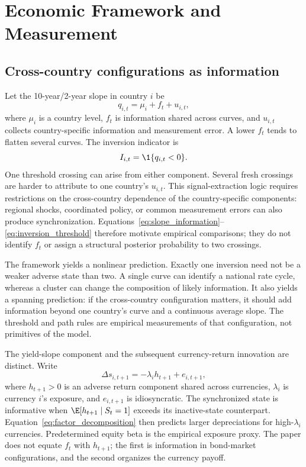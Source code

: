 \section{Economic Framework and Measurement}
\label{sec:setting}

\subsection{Cross-country configurations as information}

Let the 10-year/2-year slope in country $i$ be
\begin{equation}
    q_{i,t}=\mu_i+f_t+u_{i,t},
    \label{eq:slope_information}
\end{equation}
where $\mu_i$ is a country level, $f_t$ is information shared across curves, and $u_{i,t}$ collects country-specific information and measurement error. A lower $f_t$ tends to flatten several curves. The inversion indicator is
\begin{equation}
    I_{i,t}=\1\{q_{i,t}<0\}.
    \label{eq:inversion_threshold}
\end{equation}
One threshold crossing can arise from either component. Several fresh crossings are harder to attribute to one country's $u_{i,t}$. This signal-extraction logic requires restrictions on the cross-country dependence of the country-specific components: regional shocks, coordinated policy, or common measurement errors can also produce synchronization. Equations~\eqref{eq:slope_information}--\eqref{eq:inversion_threshold} therefore motivate empirical comparisons; they do not identify $f_t$ or assign a structural posterior probability to two crossings.

The framework yields a nonlinear prediction. Exactly one inversion need not be a weaker adverse state than two. A single curve can identify a national rate cycle, whereas a cluster can change the composition of likely information. It also yields a spanning prediction: if the cross-country configuration matters, it should add information beyond one country's curve and a continuous average slope. The threshold and path rules are empirical measurements of that configuration, not primitives of the model.

The yield-slope component and the subsequent currency-return innovation are distinct. Write
\begin{equation}
    \Delta s_{i,t+1}=-\lambda_i h_{t+1}+e_{i,t+1},
    \label{eq:factor_decomposition}
\end{equation}
where $h_{t+1}>0$ is an adverse return component shared across currencies, $\lambda_i$ is currency $i$'s exposure, and $e_{i,t+1}$ is idiosyncratic. The synchronized state is informative when $\E[h_{t+1}\mid S_t=1]$ exceeds its inactive-state counterpart. Equation~\eqref{eq:factor_decomposition} then predicts larger depreciations for high-$\lambda_i$ currencies. Predetermined equity beta is the empirical exposure proxy. The paper does not equate $f_t$ with $h_{t+1}$; the first is information in bond-market configurations, and the second organizes the currency payoff.

